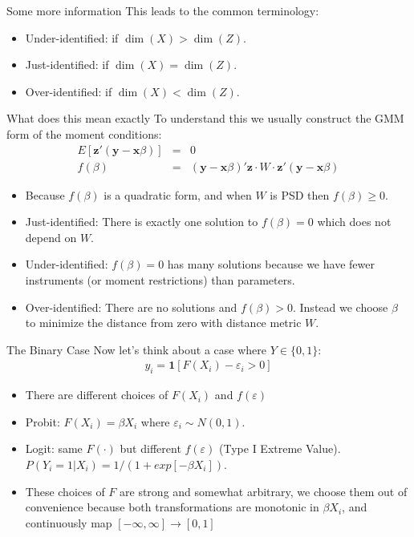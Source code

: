 \begin{frame}{Some more information}
This leads to the common terminology:
\begin{itemize}
\item Under-identified: if $\dim(X) > \dim(Z)$.
\item Just-identified: if $\dim(X) = \dim(Z)$.
\item Over-identified: if $\dim(X) < \dim(Z)$.
\end{itemize}
\end{frame}

\begin{frame}{What does this mean exactly}
To understand this we usually construct the GMM form of the moment conditions:
\begin{eqnarray*}
E[\mathbf{z}' (\mathbf{y} - \mathbf{x} \beta)] &=&0\\
f(\beta)&=&  (\mathbf{y} - \mathbf{x} \beta)' \mathbf{z} \cdot W \cdot \mathbf{z}' (\mathbf{y} - \mathbf{x} \beta)
\end{eqnarray*}
\begin{itemize}
\item Because $f(\beta)$ is a quadratic form, and when $W$ is PSD then $f(\beta) \geq 0$.
\item Just-identified: There is exactly one solution to $f(\beta) = 0$ which does not depend on $W$.
\item Under-identified: $f(\beta) = 0$ has many solutions because we have fewer instruments (or moment restrictions) than parameters.
\item Over-identified: There are no solutions and $f(\beta) > 0$. Instead we choose $\beta$ to minimize the distance from zero with distance metric $W$.
\end{itemize}
\end{frame}

\begin{frame}{The Binary Case}
Now let's think about a case where $Y \in \{0,1\}$:
\begin{eqnarray*}
y_i = \mathbf{1}[F(X_i) - \varepsilon_i > 0]
\end{eqnarray*}
\begin{itemize}
\item There are different choices of $F(X_i)$ and $f(\varepsilon)$
\item  Probit: $F(X_i) = \beta X_i$ where $\varepsilon_i \sim N(0,1)$.
\item  Logit: same $F(\cdot)$ but different $f(\varepsilon)$ (Type I Extreme Value). $P(Y_i = 1 | X_i) = 1/(1+exp[-\beta X_i])$.
\item These choices of $F$ are strong and somewhat arbitrary, we choose them out of convenience because both transformations are monotonic in $\beta X_i$, and continuously map $[-\infty,\infty] \rightarrow [0,1]$
\end{itemize}
\end{frame}


